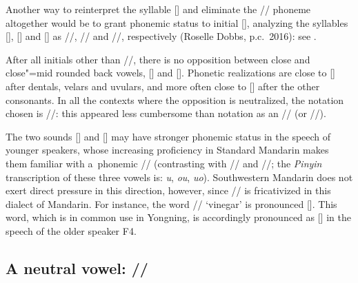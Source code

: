 		Another way to reinterpret the syllable [] and eliminate the // phoneme altogether would be to grant phonemic status to initial [], analyzing the syllables [], [] and [] as //, // and //, respectively (Roselle Dobbs, p.c.\ 2016): see . 
		
		After all initials other than //, there is no opposition between close and close"=mid rounded back vowels,
		[] and []. Phonetic realizations are close to [] after dentals, velars and
		uvulars, and more often close to [] after the other
		consonants. In all the contexts where the opposition is neutralized, the notation chosen is //: this appeared less cumbersome than notation as an  // (or //). 
		
		The two sounds [] and [] may have stronger phonemic status in the speech of younger
		speakers, whose increasing proficiency in Standard {Mandarin} makes them familiar with a~phonemic
		// (contrasting with // and //; the \textit{Pinyin} transcription of these three
		vowels is: \textit{u}, \textit{ou}, \textit{uo}). Southwestern {Mandarin} does not exert direct
		pressure in this direction, however, since // is fricativized in this dialect of {Mandarin}. For
		instance, the word // ‘vinegar’ is pronounced []. This word, which is in common
		use in Yongning, is accordingly pronounced as [] in the speech of the older speaker F4.
		
		
		\subsection{A neutral vowel:  //}
		\label{sec:aneutralvowel}
		
